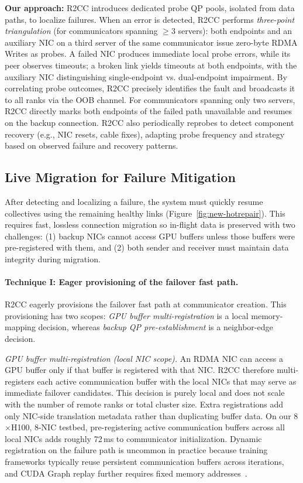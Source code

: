\textbf{Our approach:}
R2CC introduces dedicated probe QP pools, isolated from data paths, to localize failures. When an error is detected, R2CC performs \textit{three-point triangulation} (for communicators spanning $\ge$3 servers): both endpoints and an auxiliary NIC on a third server of the same communicator issue zero-byte RDMA Writes as probes. A failed NIC produces immediate local probe errors, while its peer observes timeouts; a broken link yields timeouts at both endpoints, with the auxiliary NIC distinguishing single-endpoint vs. dual-endpoint impairment. By correlating probe outcomes, R2CC precisely identifies the fault and broadcasts it to all ranks via the OOB channel. For communicators spanning only two servers, R2CC directly marks both endpoints of the failed path unavailable and resumes on the backup connection. R2CC also periodically reprobes to detect component recovery (e.g., NIC resets, cable fixes), adapting probe frequency and strategy based on observed failure and recovery patterns.

\subsection{Live Migration for Failure Mitigation}
After detecting and localizing a failure, the system must quickly resume collectives using the remaining healthy links (Figure~\ref{fig:new-hotrepair}). This requires fast, lossless connection migration so in-flight data is preserved with two challenges: (1) backup NICs cannot access GPU buffers unless those buffers were pre-registered with them, and (2) both sender and receiver must maintain data integrity during migration.

\paragraph{Technique I: Eager provisioning of the failover fast path.} R2CC eagerly provisions the failover fast path at communicator creation. This provisioning has two scopes: \emph{GPU buffer multi-registration} is a local memory-mapping decision, whereas \emph{backup QP pre-establishment} is a neighbor-edge decision.

\textit{GPU buffer multi-registration (local NIC scope).} An RDMA NIC can access a GPU buffer only if that buffer is registered with that NIC. R2CC therefore multi-registers each active communication buffer with the local NICs that may serve as immediate failover candidates. This decision is purely local and does not scale with the number of remote ranks or total cluster size. Extra registrations add only NIC-side translation metadata rather than duplicating buffer data. On our 8$\times$H100, 8-NIC testbed, pre-registering active communication buffers across all local NICs adds roughly 72\,ms to communicator initialization. Dynamic registration on the failure path is uncommon in practice because training frameworks typically reuse persistent communication buffers across iterations, and CUDA Graph replay further requires fixed memory addresses~\cite{cuda-graphs-memory-issues}.

